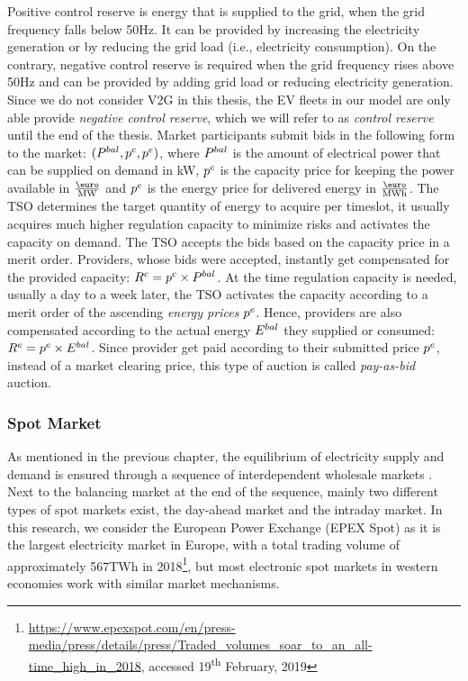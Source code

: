 \documentclass[a4paper, 12pt]{article}
\let\cite\shortcite
\begin{document}
Positive control reserve is energy that is supplied to the grid, when the grid
frequency falls below 50Hz. It can be provided by increasing the electricity
generation or by reducing the grid load (i.e., electricity consumption). On the
contrary, negative control reserve is required when the grid frequency rises
above 50Hz and can be provided by adding grid load or reducing electricity
generation. Since we do not consider V2G in this thesis, the EV fleets in our
model are only able provide \emph{negative control reserve}, which we will refer to
as \emph{control reserve} until the end of the thesis. Market participants submit
bids in the following form to the market: \((P^{bal}_{}, p^c_{}, p^e_{})\), where \(P^{bal}_{}\)
is the amount of electrical power that can be supplied on demand in kW, \(p^c_{}\) is
the capacity price for keeping the power available in \(\emw\) and
\(p^e_{}\) is the energy price for delivered energy in \(\emwh\). The TSO
determines the target quantity of energy to acquire per timeslot, it usually
acquires much higher regulation capacity to minimize risks and activates the
capacity on demand. The TSO accepts the bids based on the capacity price in a
merit order. Providers, whose bids were accepted, instantly get compensated for
the provided capacity: \(R^c = p^c_{} \times P^{bal}_{}\). At the time regulation
capacity is needed, usually a day to a week later, the TSO activates the
capacity according to a merit order of the ascending \emph{energy prices} \(p^e_{}\).
Hence, providers are also compensated according to the actual energy \(E^{bal}_{}\)
they supplied or consumed: \(R^e = p^e_{} \times E^{bal}_{}\). Since provider get paid
according to their submitted price \(p^e_{}\), instead of a market clearing price,
this type of auction is called \emph{pay-as-bid} auction.
\subsubsection{Spot Market \label{sec-spot-market}}
\label{sec:org1d38b9f}
As mentioned in the previous chapter, the equilibrium of electricity supply and
demand is ensured through a sequence of interdependent wholesale markets
\cite{pape16_are_fundam_enoug}. Next to the balancing market at the end of the
sequence, mainly two different types of spot markets exist, the day-ahead market
and the intraday market. In this research, we consider the European Power
Exchange (EPEX Spot) as it is the largest electricity market in Europe, with a
total trading volume of approximately 567TWh in 2018\footnote{\url{https://www.epexspot.com/en/press-media/press/details/press/Traded\_volumes\_soar\_to\_an\_all-time\_high\_in\_2018},
accessed 19\textsuperscript{th} February, 2019\label{org5b7997e}}, but most electronic
spot markets in western economies work with similar market mechanisms.
\end{document}
